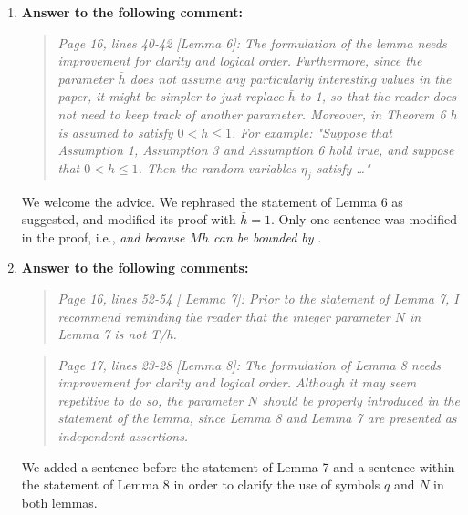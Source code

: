 \documentclass[10pt]{article}
\begin{document}
\begin{enumerate}
\item \textbf{Answer to the following comment:}
\begin{quote} \textit{Page 16, lines 40-42 [Lemma 6]: The formulation of the lemma needs improvement for clarity and logical order. Furthermore, since the parameter $\bar{h}$ does not assume any particularly interesting values in the paper, it might be simpler to just replace $\bar{h}$ to 1, so that the reader does not need to keep track of another parameter. Moreover, in Theorem 6 h is assumed to satisfy $0<h\leq 1$. For example: "Suppose that Assumption 1, Assumption 3 and Assumption 6 hold true, and suppose that $0<h\leq 1$. Then the random variables $\eta_j$ satisfy \ldots"} \end{quote} 
We welcome the advice. We rephrased the statement of Lemma 6 as suggested, and modified its proof with $\bar h = 1$. Only one sentence was modified in the proof, i.e., \textit{and because $Mh$ can be bounded by  }.

\item \textbf{Answer to the following comments:}
\begin{quote} \textit{Page 16, lines 52-54 [ Lemma 7]: Prior to the statement of Lemma 7, I recommend reminding the reader that the integer parameter $N$ in Lemma 7 is not T/h.} \end{quote}
\begin{quote} \textit{Page 17, lines 23-28 [Lemma 8]: The formulation of Lemma 8 needs improvement for clarity and logical order. Although it may seem repetitive to do so, the parameter $N$ should be properly introduced in the statement of the lemma, since Lemma 8 and Lemma 7 are presented as independent assertions.} \end{quote} 
We added a sentence before the statement of Lemma 7 and a sentence within the statement of Lemma 8 in order to clarify the use of symbols $q$ and $N$ in both lemmas.


\end{enumerate}
\end{document}
